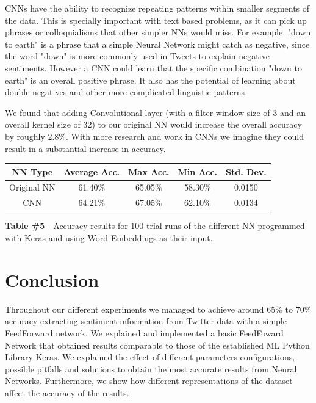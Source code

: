 \documentclass[11pt,onecolumn]{article} %
\begin{document}
	CNNs \cite{Kim14} have the ability to recognize repeating patterns within smaller segments of the data. This is specially important with text based problems, as it can pick up phrases or colloquialisms that other simpler NNs would miss. For example, "down to earth" is a phrase that a simple Neural Network might catch as negative, since the word "down" is more commonly used in Tweets to explain negative sentiments. However a CNN could learn that the specific combination "down to earth" is an overall positive phrase. It also has the potential of learning about double negatives and other more complicated linguistic patterns.
	\par We found that adding Convolutional layer (with a filter window size of 3 and an overall kernel size of 32) to our original NN would increase the overall accuracy by roughly 2.8\%. With more research and work in CNNs we imagine they could result in a substantial increase in accuracy.
	
	
	
	
	\begin{center}
		\begin{tabular}{ | c | c | c | c | c |}
			\hline
			NN Type & Average Acc. & Max Acc. & Min Acc. & Std. Dev. \\
			\hline
			Original NN & 61.40\% &	65.05\% & 58.30\% & 0.0150 \\
			\hline
			CNN & 64.21\% & 67.05\% & 62.10\% & 0.0134 \\
			\hline
		\end{tabular}
		\newline
		\newline
		\textbf{Table \#5} - Accuracy results for 100 trial runs of the different NN programmed with Keras and using Word Embeddings as their input.
	\end{center}
	
	
	\section{Conclusion}
	Throughout our different experiments we managed to achieve around 65\% to 70\% accuracy extracting sentiment information from Twitter data with a simple FeedForward network. We explained and implemented a basic FeedFoward Network that obtained results comparable to those of the established ML Python Library Keras. We explained the effect of different parameters configurations, possible pitfalls and solutions to obtain the most accurate results from Neural Networks. Furthermore, we show how different representations of the dataset affect the accuracy of the results.
	
\end{document}
